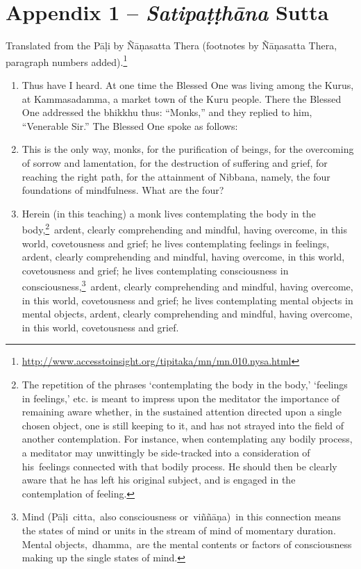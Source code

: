\section{Appendix 1 -- \textit{Satipaṭṭhāna} Sutta}

Translated from the Pāḷi by Ñāṇasatta Thera (footnotes by Ñāṇasatta Thera, paragraph numbers added).\footnote{\url{http://www.accesstoinsight.org/tipitaka/mn/mn.010.nysa.html}}

\begin{enumerate}
\item Thus have I heard. At one time the Blessed One was living among the Kurus, at Kammasadamma, a market town of the Kuru people. There the Blessed One addressed the bhikkhu thus: ``Monks,'' and they replied to him, ``Venerable Sir.'' The Blessed One spoke as follows:
\item This is the only way, monks, for the purification of beings, for the overcoming of sorrow and lamentation, for the destruction of suffering and grief, for reaching the right path, for the attainment of Nibbana, namely, the four foundations of mindfulness. What are the four?
\item Herein (in this teaching) a monk lives contemplating the body in the body,\footnote{The repetition of the phrases ‘contemplating the body in the body,’ ‘feelings in feelings,’ etc. is meant to impress upon the meditator the importance of remaining aware whether, in the sustained attention directed upon a single chosen object, one is still keeping to it, and has not strayed into the field of another contemplation. For instance, when contemplating any bodily process, a meditator may unwittingly be side-tracked into a consideration of his feelings connected with that bodily process. He should then be clearly aware that he has left his original subject, and is engaged in the contemplation of feeling.} ardent, clearly comprehending and mindful, having overcome, in this world, covetousness and grief; he lives contemplating feelings in feelings, ardent, clearly comprehending and mindful, having overcome, in this world, covetousness and grief; he lives contemplating consciousness in consciousness,\footnote{Mind (Pāḷi citta, also consciousness or viññāṇa) in this connection means the states of mind or units in the stream of mind of momentary duration. Mental objects, dhamma, are the mental contents or factors of consciousness making up the single states of mind.} ardent, clearly comprehending and mindful, having overcome, in this world, covetousness and grief; he lives contemplating mental objects in mental objects, ardent, clearly comprehending and mindful, having overcome, in this world, covetousness and grief.
\end{enumerate}


